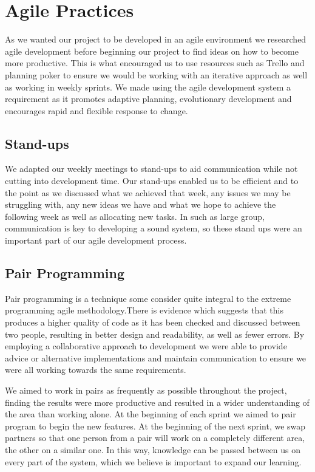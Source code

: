 \documentclass[11pt, a4paper]{report}
\begin{document}
\section{Agile Practices}

As we wanted our project to be developed in an agile environment we researched agile development before beginning our project to find ideas on how to become more productive. This is what encouraged us to use resources such as Trello and planning poker to ensure we would be working with an iterative approach as well as working in weekly sprints. We made using the agile development system a requirement as it promotes adaptive planning, evolutionary development and encourages rapid and flexible response to change.

\subsection{Stand-ups}

We adapted our weekly meetings to stand-ups to aid communication while not cutting into development time. Our stand-ups enabled us to be efficient and to the point as we discussed what we achieved that week, any issues we may be struggling with, any new ideas we have and what we hope to achieve the following week as well as allocating new tasks. In such as large group, communication is key to developing a sound system, so these stand ups were an important part of our agile development process. 

\subsection{Pair Programming}

Pair programming is a technique some consider quite integral to the extreme programming agile methodology.There is evidence which suggests that this produces a higher quality of code as it has been checked and discussed between two people, resulting in better design and readability, as well as fewer errors. By employing a collaborative approach to development we were able to  provide advice or alternative implementations and maintain communication to ensure we were all working towards the same requirements. 

We aimed to work in pairs as frequently as possible throughout the project, finding the results were more productive and resulted in a wider understanding of the area than working alone. At the beginning of each sprint we aimed to pair program to begin the new features. At the beginning of the next sprint, we swap partners so that one person from a pair will work on a completely different area, the other on a similar one. In this way, knowledge can be passed between us on every part of the system, which we believe is important to expand our learning.
\end{document}
